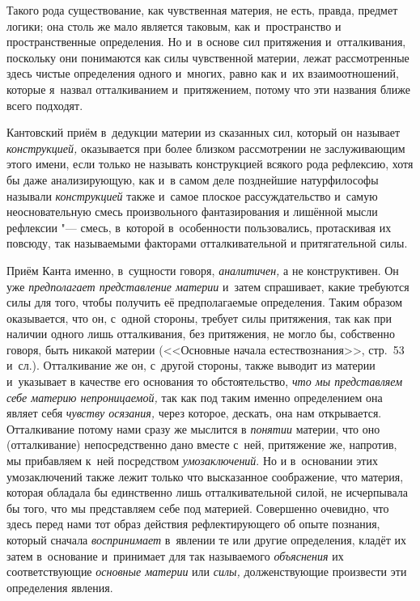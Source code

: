 Такого рода существование, как чувственная материя, не есть, правда, предмет
логики; она столь же мало является таковым, как и~пространство и
пространственные определения. Но и~в основе сил притяжения и~отталкивания,
поскольку они понимаются как силы чувственной материи, лежат рассмотренные
здесь чистые определения одного и~многих, равно как и~их взаимоотношений,
которые я~назвал отталкиванием и~притяжением, потому что эти названия ближе
всего подходят.

Кантовский приём в~дедукции материи из сказанных сил, который он называет
{\em конструкцией,} оказывается при более близком
рассмотрении не заслуживающим этого имени, если только не называть
конструкцией всякого рода рефлексию, хотя бы даже анализирующую, как и~в
самом деле позднейшие натурфилософы называли
{\em конструкцией} также и~самое плоское
рассуждательство и~самую неосновательную смесь произвольного фантазирования
и лишённой мысли рефлексии "--- смесь, в~которой в~особенности пользовались,
протаскивая их повсюду, так называемыми факторами отталкивательной и
притягательной силы.

Приём Канта именно, в~сущности говоря, {\em аналитичен,}
а не конструктивен. Он уже {\em предполагает
представление материи} и~затем спрашивает, какие требуются силы для того,
чтобы получить её предполагаемые определения. Таким образом оказывается,
что он, с~одной стороны, требует силы притяжения, так как при наличии
одного лишь отталкивания, без притяжения, не могло бы, собственно говоря,
быть никакой материи (<<Основные начала естествознания>>, стр.~53 и~сл.).
Отталкивание же он, с~другой стороны, также выводит из материи и~указывает
в качестве его основания то обстоятельство, {\em что мы
представляем себе материю непроницаемой,} так как под таким именно
определением она являет себя {\em чувству осязания,}
через которое, дескать, она нам открывается. Отталкивание потому нами сразу
же мыслится в {\em понятии} материи, что оно
(отталкивание) непосредственно дано вместе с~ней, притяжение же, напротив,
мы прибавляем к~ней посредством {\em умозаключений}. Но
и в~основании этих умозаключений также лежит только что высказанное
соображение, что материя, которая обладала бы единственно лишь
отталкивательной силой, не исчерпывала бы того, что мы представляем себе
под материей. Совершенно очевидно, что здесь перед нами тот образ действия
рефлектирующего об опыте познания, который сначала
{\em воспринимает} в~явлении те или другие определения,
кладёт их затем в~основание и~принимает для так называемого
{\em объяснения} их соответствующие {\em основные материи} или
{\em силы,} долженствующие произвести эти определения явления.

